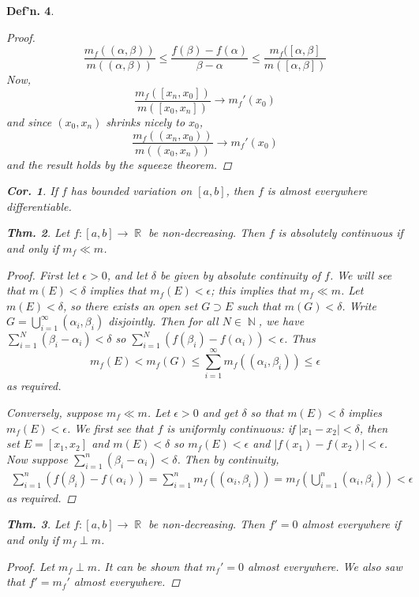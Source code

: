 \documentclass[12pt, a4paper]{book}
\DeclareMathOperator{\N}{\mathbb{N}}
\DeclareMathOperator{\R}{\mathbb{R}}
\newtheorem{theorem}{Thm.}[section]
\newtheorem{definition}[theorem]{Def'n.}
\newtheorem{corollary}[theorem]{Cor.}
\theoremstyle{nonumberplain}
\newtheorem{proof}{Proof}
\begin{document}
\begin{definition}
\begin{proof}
\begin{equation*}
        \frac{m_f((\alpha,\beta))}{m((\alpha,\beta))} \leq\frac{f(\beta)-f(\alpha)}{\beta-\alpha}\leq\frac{m_f([\alpha,\beta]}{m([\alpha,\beta])}
    \end{equation*}
    Now,
    \begin{equation*}
        \frac{m_f([x_n,x_0])}{m([x_0,x_n])}\to m_f'(x_0)
    \end{equation*}
    and since $(x_0,x_n)$ shrinks nicely to $x_0$,
    \begin{equation*}
        \frac{m_f((x_n,x_0))}{m((x_0,x_n))}\to m_f'(x_0)
    \end{equation*}
    and the result holds by the squeeze theorem.
\end{proof}
\begin{corollary}
    If $f$ has bounded variation on $[a,b]$, then $f$ is almost everywhere differentiable.
\end{corollary}
\begin{theorem}
    Let $f:[a,b]\to\R$ be non-decreasing.
    Then $f$ is absolutely continuous if and only if $m_f\ll m$.
\end{theorem}
\begin{proof}
    First let $\epsilon>0$, and let $\delta$ be given by absolute continuity of $f$.
    We will see that $m(E)<\delta$ implies that $m_f(E)<\epsilon$; this implies that $m_f\ll m$.
    Let $m(E)<\delta$, so there exists an open set $G\supset E$ such that $m(G)<\delta$.
    Write $G=\bigcup_{i=1}^\infty(\alpha_i,\beta_i)$ disjointly.
    Then for all $N\in\N$, we have $\sum_{i=1}^N(\beta_i-\alpha_i)<\delta$ so $\sum_{i=1}^N(f(\beta_i)-f(\alpha_i))<\epsilon$.
    Thus
    \[m_f(E)<m_f(G)\leq\sum\limits_{i=1}^\infty m_f((\alpha_i,\beta_i))\leq\epsilon\]
    as required.

    Conversely, suppose $m_f\ll m$.
    Let $\epsilon>0$ and get $\delta$ so that $m(E)<\delta$ implies $m_f(E)<\epsilon$.
    We first see that $f$ is uniformly continuous: if $|x_1-x_2|<\delta$, then set $E=[x_1,x_2]$ and $m(E)<\delta$ so $m_f(E)<\epsilon$ and $|f(x_1)-f(x_2)|<\epsilon$.
    Now suppose $\sum_{i=1}^n(\beta_i-\alpha_i)<\delta$.
    Then by continuity,
    \begin{align*}
        \sum\limits_{i=1}^n(f(\beta_i)-f(\alpha_i)) =\sum\limits_{i=1}^n m_f((\alpha_i,\beta_i))=m_f\left(\bigcup\limits_{i=1}^n(\alpha_i,\beta_i)\right)<\epsilon
    \end{align*}
    as required.
\end{proof}
\begin{theorem}
    Let $f:[a,b]\to\R$ be non-decreasing.
    Then $f'=0$ almost everywhere if and only if $m_f\perp m$.
\end{theorem}
\begin{proof}
    Let $m_f\perp m$.
    It can be shown that $m_f'=0$ almost everywhere.
    We also saw that $f'=m_f'$ almost everywhere.


\end{proof}
\end{definition}
\end{document}
